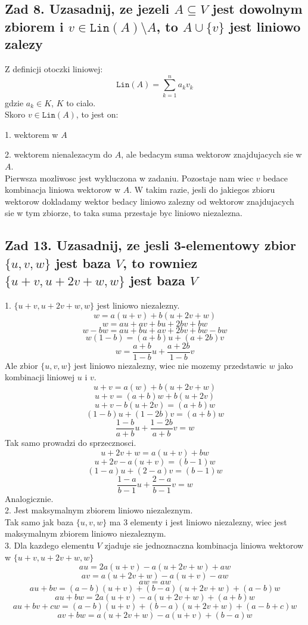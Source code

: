 \documentclass{article}
\begin{document}
\ttfamily
\subsection*{Zad 8. Uzasadnij, ze jezeli $A\subseteq V$ jest dowolnym zbiorem i $v\in\texttt{Lin}(A)\setminus A$, to $A\cup\{v\}$ jest liniowo zalezy}
    Z definicji otoczki liniowej:
    $$\texttt{Lin}(A)=\sum\limits_{k=1}^na_kv_k$$
    gdzie $a_k\in K$, $K$ to cialo.\smallskip\\
    Skoro $v\in\texttt{Lin}(A)$, to jest on:\par
        1. wektorem w $A$\par
        2. wektorem nienalezacym do $A$, ale bedacym suma wektorow znajdujacych sie w $A$.\smallskip\\
    Pierwsza mozliwosc jest wykluczona w zadaniu. Pozostaje nam wiec $v$ bedace kombinacja liniowa wektorow w $A$. W takim razie, jesli do jakiegos zbioru wektorow dokladamy wektor bedacy liniowo zalezny od wektorow znajdujacych sie w tym zbiorze, to taka suma przestaje byc liniowo niezalezna.
\subsection*{Zad 13. Uzasadnij, ze jesli 3-elementowy zbior $\{u, v, w\}$ jest baza $V$, to rowniez $\{u+v, u+2v+w, w\}$ jest baza $V$}
    1. $\{u+v, u+2v+w, w\}$ jest liniowo niezalezny.
    $$w=a(u+v)+b(u+2v+w)$$
    $$w=au+av+bu+2bv+bw$$
    $$w-bw=au+bu+av+2bv+bw-bw$$
    $$w(1-b)=(a+b)u+(a+2b)v$$
    $$w=\frac{a+b}{1-b}u+\frac{a+2b}{1-b}v$$
    Ale zbior $\{u,v,w\}$ jest liniowo niezalezny, wiec nie mozemy przedstawic $w$ jako kombinacji liniowej $u$ i $v$.
    $$u+v=a(w)+b(u+2v+w)$$
    $$u+v=(a+b)w+b(u+2v)$$
    $$u+v-b(u+2v)=(a+b)w$$
    $$(1-b)u+(1-2b)v=(a+b)w$$
    $$\frac{1-b}{a+b}u+\frac{1-2b}{a+b}v=w$$
    Tak samo prowadzi do sprzecznosci.
    $$u+2v+w=a(u+v)+bw$$
    $$u+2v-a(u+v)=(b-1)w$$
    $$(1-a)u+(2-a)v=(b-1)w$$
    $$\frac{1-a}{b-1}u+\frac{2-a}{b-1}v=w$$
    Analogicznie.\bigskip\\
    2. Jest maksymalnym zbiorem liniowo niezaleznym.\smallskip\\
    Tak samo jak baza $\{u,v,w\}$ ma 3 elementy i jest liniowo niezalezny, wiec jest maksymalnym zbiorem liniowo niezaleznym.\bigskip\\
    3. Dla kazdego elementu $V$ zjaduje sie jednoznaczna kombinacja liniowa wektorow w $\{u+v, u+2v+w, w\}$
    $$au=2a(u+v)-a(u+2v+w)+aw$$
    $$av=a(u+2v+w)-a(u+v)-aw$$
    $$aw=aw$$
    $$au+bv=(a-b)(u+v)+(b-a)(u+2v+w)+(a-b)w$$
    $$au+bw=2a(u+v)-a(u+2v+w)+(a+b)w$$
    $$au+bv+cw=(a-b)(u+v)+(b-a)(u+2v+w)+(a-b+c)w$$
    $$av+bw=a(u+2v+w)-a(u+v)+(b-a)w$$
\end{document}
